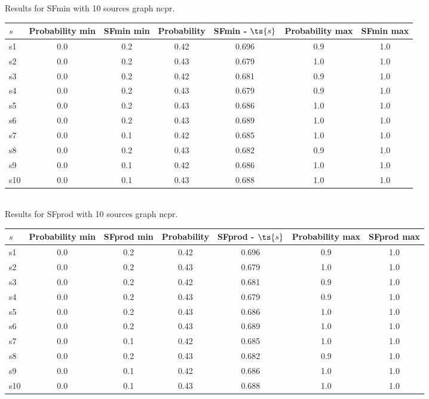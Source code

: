 \documentclass{article}
\begin{document}
\noindent Results for SFmin with 10 sources graph ncpr.

\noindent\begin{tabular}{|l|c|c|c|c|c|c|}
\hline
$s$& Probability min & SFmin min & Probability & SFmin - $\ts{s}$ & Probability max & SFmin max\\
\hline
s1 &0.0 & 0.2 & 0.42 & 0.696 & 0.9 & 1.0\\
\hline
s2 &0.0 & 0.2 & 0.43 & 0.679 & 1.0 & 1.0\\
\hline
s3 &0.0 & 0.2 & 0.42 & 0.681 & 0.9 & 1.0\\
\hline
s4 &0.0 & 0.2 & 0.43 & 0.679 & 0.9 & 1.0\\
\hline
s5 &0.0 & 0.2 & 0.43 & 0.686 & 1.0 & 1.0\\
\hline
s6 &0.0 & 0.2 & 0.43 & 0.689 & 1.0 & 1.0\\
\hline
s7 &0.0 & 0.1 & 0.42 & 0.685 & 1.0 & 1.0\\
\hline
s8 &0.0 & 0.2 & 0.43 & 0.682 & 0.9 & 1.0\\
\hline
s9 &0.0 & 0.1 & 0.42 & 0.686 & 1.0 & 1.0\\
\hline
s10 &0.0 & 0.1 & 0.43 & 0.688 & 1.0 & 1.0\\
\hline
\end{tabular}\\

\noindent Results for SFprod with 10 sources graph ncpr.

\noindent\begin{tabular}{|l|c|c|c|c|c|c|}
\hline
$s$& Probability min & SFprod min & Probability & SFprod - $\ts{s}$ & Probability max & SFprod max\\
\hline
s1 &0.0 & 0.2 & 0.42 & 0.696 & 0.9 & 1.0\\
\hline
s2 &0.0 & 0.2 & 0.43 & 0.679 & 1.0 & 1.0\\
\hline
s3 &0.0 & 0.2 & 0.42 & 0.681 & 0.9 & 1.0\\
\hline
s4 &0.0 & 0.2 & 0.43 & 0.679 & 0.9 & 1.0\\
\hline
s5 &0.0 & 0.2 & 0.43 & 0.686 & 1.0 & 1.0\\
\hline
s6 &0.0 & 0.2 & 0.43 & 0.689 & 1.0 & 1.0\\
\hline
s7 &0.0 & 0.1 & 0.42 & 0.685 & 1.0 & 1.0\\
\hline
s8 &0.0 & 0.2 & 0.43 & 0.682 & 0.9 & 1.0\\
\hline
s9 &0.0 & 0.1 & 0.42 & 0.686 & 1.0 & 1.0\\
\hline
s10 &0.0 & 0.1 & 0.43 & 0.688 & 1.0 & 1.0\\
\hline
\end{tabular}\\
\end{document}
